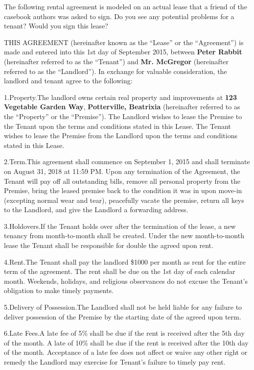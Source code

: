 The following rental agreement is modeled on an actual lease that a friend of
the casebook authors was asked to sign.  Do you see any potential problems for
a tenant?  Would you sign this lease?


THIS AGREEMENT (hereinafter known as the ``Lease'' or the ``Agreement'') is made
and entered into this 1st day of September 2015, between
\textbf{Peter Rabbit} (hereinafter referred to as the ``Tenant'') and
\textbf{Mr. McGregor} (hereinafter referred to as the ``Landlord'').  In
exchange for valuable consideration, the landlord and tenant agree to the
following:

1.\quad Property.\quad The landlord owns certain real property and improvements
at \textbf{123 Vegetable Garden Way}, \textbf{Potterville, Beatrixia}
(hereinafter referred to as the ``Property'' or the ``Premise'').  The Landlord
wishes to lease the Premise to the Tenant upon the terms and conditions stated
in this Lease.  The Tenant wishes to lease the Premise from the Landlord upon
the terms and conditions stated in this Lease.

2.\quad Term.\quad This agreement shall commence on September 1, 2015 and shall
terminate on August 31, 2018 at 11:59 PM.  Upon any termination of the
Agreement,
the Tenant will pay off all outstanding bills, remove all personal property from
the Premise, bring the leased premise back to the condition it was in upon
move-in (excepting normal wear and tear), peacefully vacate the premise, return
all keys to the Landlord, and give the Landlord a forwarding address.  

3.\quad Holdovers.\quad If the Tenant holds over after the termination of the lease, a
new tenancy from month-to-month shall be created.  Under the new month-to-month
lease the Tenant shall be responsible for double the agreed upon rent.  

4.\quad Rent.\quad The Tenant shall pay the landlord \$1000 per month as rent for the
entire term of the agreement.  The rent shall be due on the
1st day of each calendar month.  Weekends, holidays, and
religious observances do not excuse the Tenant's obligation to make timely
payments.

5.\quad Delivery of Possession.\quad The Landlord shall not be held liable for any
failure to deliver possession of the Premise by the starting date of the agreed
upon term.

6.\quad Late Fees.\quad A late fee of 5\% shall be due if the rent is received after the
5th day of the month.  A late of 10\% shall be due if the
rent is received after the 10th day of the month.  Acceptance
of a late fee does not affect or waive any other right or remedy the Landlord
may exercise for Tenant's failure to timely pay rent.  

